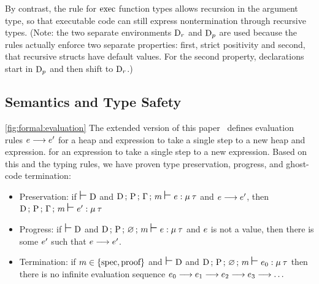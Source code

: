 By contrast, the rule for $\exec$ function types allows recursion in the argument type,
so that executable code can still express nontermination through recursive types.
(Note: the two separate environments $\datadecls_r$ and $\datadecls_p$
are used because the rules actually enforce two separate properties:
first, strict positivity and second, that recursive structs have default values.
For the second property, declarations start in $\datadecls_p$ and then shift to $\datadecls_r$.)
\fi

\subsection{Semantics and Type Safety} \label{sec:soundness}

\ifextended
\autoref{fig:formal:evaluation}
\else
The extended version of this paper~\cite{verus2023extended}
\fi
defines evaluation rules
$\heapexp{\heapval}{\expr} \fullstep \heapexp{\heapval'}{\expr'}$
\ifextended
for a heap and expression to take a single step to a new heap and expression.
\else
for an expression to take a single step to a new expression.
\fi
Based on this and the typing rules,
we have proven type preservation,
progress, and ghost-code termination:

\begin{itemize}
\item Preservation:
if $\djudgment\datadecls$
and $\sjudgment{\datadecls}{\heaptyp}{\penv}{\xenv}{\mode}{\heapval}{\expr}{\modeu}{\typ}$
and $\heapexp{\heapval}{\expr} \fullstep \heapexp{\heapval'}{\expr'}$,\newline
then $\sjudgment{\datadecls}{\heaptyp}{\penv}{\xenv}{\mode}{\heapval'}{\expr'}{\modeu}{\typ}$
\item Progress:
if $\djudgment\datadecls$
and $\sjudgment{\datadecls}{\heaptyp}{\penv}{\varnothing}{\mode}{\heapval}{\expr}{\modeu}{\typ}$
and $\expr$ is not a value,\newline
then there is some $\heapexp{\heapval'}{\expr'}$ such that $\heapexp{\heapval}{\expr} \fullstep \heapexp{\heapval'}{\expr'}$.
\item Termination:
if $\mode\in\{\spec, \prf\}$
and $\djudgment\datadecls$
and $\sjudgment{\datadecls}{\heaptyp}{\penv}{\varnothing}{\mode}{\heapval_0}{\expr_0}{\modeu}{\typ}$
then there is no infinite evaluation sequence
$\heapexp{\heapval_0}{\expr_0} \fullstep \heapexp{\heapval_1}{\expr_1} \fullstep \heapexp{\heapval_2}{\expr_2} \fullstep \heapexp{\heapval_3}{\expr_3} \fullstep \ldots$
\end{itemize}

